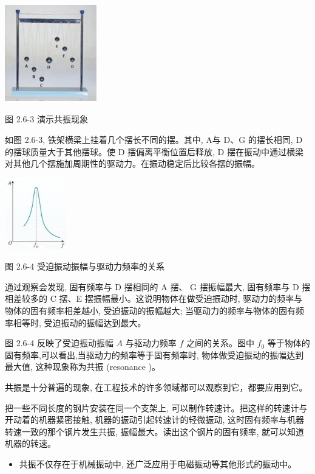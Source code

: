 \documentclass[10pt]{article}
\begin{document}
\begin{center}
\includegraphics[max width=0.3\textwidth]{images/01910e4c-ebb8-7d2c-8f2f-2375bc1d2d12_60_341184.jpg}
\end{center}

图 2.6-3 演示共振现象

如图 2.6-3, 铁架横梁上挂着几个摆长不同的摆。其中, A与 D、G 的摆长相同, D 的摆球质量大于其他摆球。使 D 摆偏离平衡位置后释放, D 摆在振动中通过横梁对其他几个摆施加周期性的驱动力。在振动稳定后比较各摆的振幅。

\begin{center}
\includegraphics[max width=0.2\textwidth]{images/01910e4c-ebb8-7d2c-8f2f-2375bc1d2d12_61_527569.jpg}
\end{center}

图 2.6-4 受迫振动振幅与驱动力频率的关系

通过观察会发现, 固有频率与 D 摆相同的 A 摆、 G 摆振幅最大, 固有频率与 D 摆相差较多的 C 摆、E 摆振幅最小。这说明物体在做受迫振动时, 驱动力的频率与物体的固有频率相差越小, 受迫振动的振幅越大; 当驱动力的频率与物体的固有频率相等时, 受迫振动的振幅达到最大。

图 2.6-4 反映了受迫振动振幅 \(A\) 与驱动力频率 \(f\) 之间的关系。图中 \({f}_{0}\) 等于物体的固有频率,可以看出,当驱动力的频率等于固有频率时, 物体做受迫振动的振幅达到最大值, 这种现象称为共振 (resonance )。

共振是十分普遍的现象, 在工程技术的许多领域都可以观察到它，都要应用到它。

把一些不同长度的钢片安装在同一个支架上, 可以制作转速计。把这样的转速计与开动着的机器紧密接触, 机器的振动引起转速计的轻微振动, 这时固有频率与机器转速一致的那个钢片发生共振, 振幅最大。读出这个钢片的固有频率, 就可以知道机器的转速。

\begin{mdframed}

\begin{itemize}
\item 共振不仅存在于机械振动中, 还广泛应用于电磁振动等其他形式的振动中。
\end{itemize}

\end{mdframed}
\end{document}
